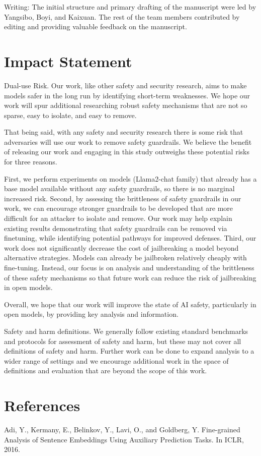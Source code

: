 \documentclass[10pt]{article}
\begin{document}
Writing: The initial structure and primary drafting of the manuscript were led by Yangsibo, Boyi, and Kaixuan. The rest of the team members contributed by editing and providing valuable feedback on the manuscript.

\section*{Impact Statement}
Dual-use Risk. Our work, like other safety and security research, aims to make models safer in the long run by identifying short-term weaknesses. We hope our work will spur additional researching robust safety mechanisms that are not so sparse, easy to isolate, and easy to remove.

That being said, with any safety and security research there is some risk that adversaries will use our work to remove safety guardrails. We believe the benefit of releasing our work and engaging in this study outweighs these potential risks for three reasons.

First, we perform experiments on models (Llama2-chat family) that already has a base model available without any safety guardrails, so there is no marginal increased risk. Second, by assessing the brittleness of safety guardrails in our work, we can encourage stronger guardrails to be developed that are more difficult for an attacker to isolate and remove. Our work may help explain existing results demonstrating that safety guardrails can be removed via finetuning, while identifying potential pathways for improved defenses. Third, our work does not significantly decrease the cost of jailbreaking a model beyond alternative strategies. Models can already be jailbroken relatively cheaply with fine-tuning. Instead, our focus is on analysis and understanding of the brittleness of these safety mechanisms so that future work can reduce the risk of jailbreaking in open models.

Overall, we hope that our work will improve the state of AI safety, particularly in open models, by providing key analysis and information.

Safety and harm definitions. We generally follow existing standard benchmarks and protocols for assessment of safety and harm, but these may not cover all definitions of safety and harm. Further work can be done to expand analysis to a wider range of settings and we encourage additional work in the space of definitions and evaluation that are beyond the scope of this work.

\section*{References}
Adi, Y., Kermany, E., Belinkov, Y., Lavi, O., and Goldberg, Y. Fine-grained Analysis of Sentence Embeddings Using Auxiliary Prediction Tasks. In ICLR, 2016.
\end{document}
